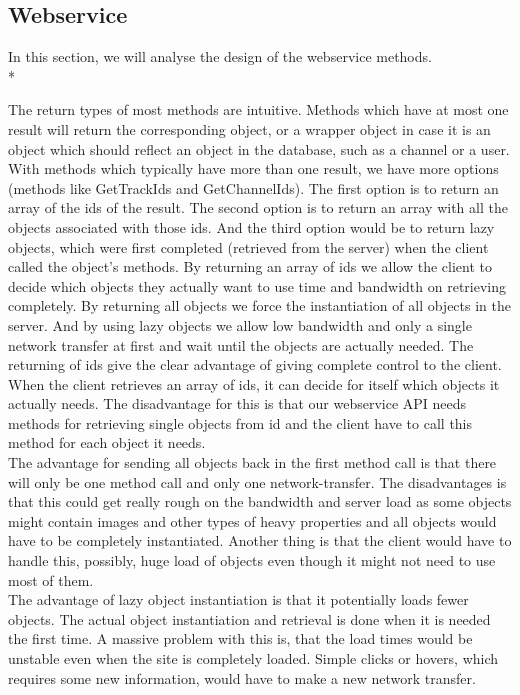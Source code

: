 \documentclass[a4paper,11pt,report]{article}
\begin{document}
\subsection{Webservice}
In this section, we will analyse the design of the webservice methods.  \\*

The return types of most methods are intuitive. Methods which have at most one result will return the corresponding object, or a wrapper object in case it is an object which should reflect an object in the database, such as a channel or a user. \\
With methods which typically have more than one result, we have more options (methods like GetTrackIds and GetChannelIds). 
The first option is to return an array of the ids of the result. The second option is to return an array with all the objects associated with those ids. And the third option would be to return lazy objects, which were first completed (retrieved from the server) when the client called the object's methods. By returning an array of ids we allow the client to decide which objects they actually want to use time and bandwidth on retrieving completely. By returning all objects we force the instantiation of all objects in the server. And by using lazy objects we allow low bandwidth and only a single network transfer at first and wait until the objects are actually needed.
The returning of ids give the clear advantage of giving complete control to the client. When the client retrieves an array of ids, it can decide for itself which objects it actually needs. The disadvantage for this is that our webservice API needs methods for retrieving single objects from id and the client have to call this method for each object it needs. \\
The advantage for sending all objects back in the first method call is that there will only be one method call and only one network-transfer. The disadvantages is that this could get really rough on the bandwidth and server load as some objects might contain images and other types of heavy properties and all objects would have to be completely instantiated. Another thing is that the client would have to handle this, possibly, huge load of objects even though it might not need to use most of them. \\
The advantage of lazy object instantiation is that it potentially loads fewer objects. The actual object instantiation and retrieval is done when it is needed the first time. A massive problem with this is, that the load times would be unstable even when the site is completely loaded. Simple clicks or hovers, which requires some new information, would have to make a new network transfer. \\
\end{document}
